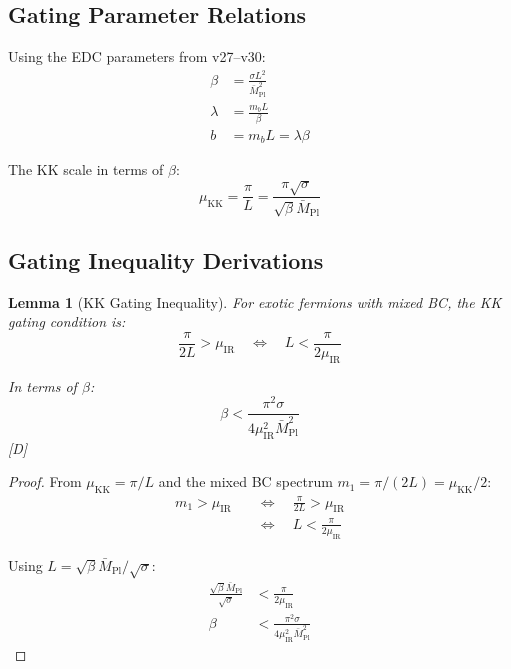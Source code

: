 \documentclass[11pt,a4paper]{article}
\newtheorem{lemma}[theorem]{Lemma}
\newcommand{\tagD}{\textcolor{blue!70!black}{[D]}}
\begin{document}
\subsection{Gating Parameter Relations}

Using the EDC parameters from v27--v30:
\begin{align}
\label{eq:beta-def}
\beta &= \frac{\sigma L^2}{\bar{M}_{\text{Pl}}^2} \\
\label{eq:lambda-def}
\lambda &= \frac{m_b L}{\beta} \\
\label{eq:b-def}
b &= m_b L = \lambda \beta
\end{align}

The KK scale in terms of $\beta$:
\begin{equation}
\label{eq:mu-kk-beta}
\mu_{\text{KK}} = \frac{\pi}{L} = \frac{\pi \sqrt{\sigma}}{\sqrt{\beta} \bar{M}_{\text{Pl}}}
\end{equation}

\subsection{Gating Inequality Derivations}

\begin{lemma}[KK Gating Inequality]
\label{lem:kk-gating}
For exotic fermions with mixed BC, the KK gating condition is:
\begin{equation}
\label{eq:kk-gate-ineq}
\frac{\pi}{2L} > \mu_{\text{IR}} \quad \Leftrightarrow \quad L < \frac{\pi}{2\mu_{\text{IR}}}
\end{equation}

In terms of $\beta$:
\begin{equation}
\label{eq:kk-gate-beta}
\beta < \frac{\pi^2 \sigma}{4 \mu_{\text{IR}}^2 \bar{M}_{\text{Pl}}^2}
\end{equation}
\tagD
\end{lemma}

\begin{proof}
From $\mu_{\text{KK}} = \pi/L$ and the mixed BC spectrum $m_1 = \pi/(2L) = \mu_{\text{KK}}/2$:
\begin{align}
\label{eq:kk-proof-1}
m_1 > \mu_{\text{IR}} \quad &\Leftrightarrow \quad \frac{\pi}{2L} > \mu_{\text{IR}} \\
\label{eq:kk-proof-2}
&\Leftrightarrow \quad L < \frac{\pi}{2\mu_{\text{IR}}}
\end{align}

Using $L = \sqrt{\beta} \bar{M}_{\text{Pl}} / \sqrt{\sigma}$:
\begin{align}
\label{eq:kk-proof-3}
\frac{\sqrt{\beta} \bar{M}_{\text{Pl}}}{\sqrt{\sigma}} &< \frac{\pi}{2\mu_{\text{IR}}} \\
\label{eq:kk-proof-4}
\beta &< \frac{\pi^2 \sigma}{4 \mu_{\text{IR}}^2 \bar{M}_{\text{Pl}}^2}
\end{align}
\end{proof}
\end{document}

